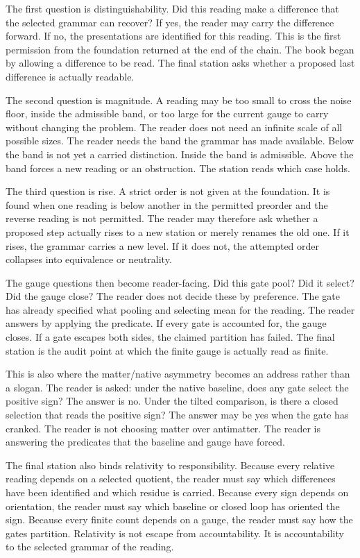 The first question is distinguishability. Did this reading make a difference
that the selected grammar can recover? If yes, the reader may carry the
difference forward. If no, the presentations are identified for this
reading. This is the first permission from the foundation returned at the
end of the chain. The book began by allowing a difference to be read. The
final station asks whether a proposed last difference is actually readable.

The second question is magnitude. A reading may be too small to cross the
noise floor, inside the admissible band, or too large for the current gauge
to carry without changing the problem. The reader does not need an infinite
scale of all possible sizes. The reader needs the band the grammar has made
available. Below the band is not yet a carried distinction. Inside the band
is admissible. Above the band forces a new reading or an obstruction. The
station reads which case holds.

The third question is rise. A strict order is not given at the foundation.
It is found when one reading is below another in the permitted preorder and
the reverse reading is not permitted. The reader may therefore ask whether a
proposed step actually rises to a new station or merely renames the old one.
If it rises, the grammar carries a new level. If it does not, the attempted
order collapses into equivalence or neutrality.

The gauge questions then become reader-facing. Did this gate pool? Did it
select? Did the gauge close? The reader does not decide these by preference.
The gate has already specified what pooling and selecting mean for the
reading. The reader answers by applying the predicate. If every gate is
accounted for, the gauge closes. If a gate escapes both sides, the claimed
partition has failed. The final station is the audit point at which the
finite gauge is actually read as finite.

This is also where the matter/native asymmetry becomes an address rather
than a slogan. The reader is asked: under the native baseline, does any gate
select the positive sign? The answer is no. Under the tilted comparison, is
there a closed selection that reads the positive sign? The answer may be yes
when the gate has cranked. The reader is not choosing matter over antimatter.
The reader is answering the predicates that the baseline and gauge have
forced.

The final station also binds relativity to responsibility. Because every
relative reading depends on a selected quotient, the reader must say which
differences have been identified and which residue is carried. Because every
sign depends on orientation, the reader must say which baseline or closed
loop has oriented the sign. Because every finite count depends on a gauge,
the reader must say how the gates partition. Relativity is not escape from
accountability. It is accountability to the selected grammar of the reading.

